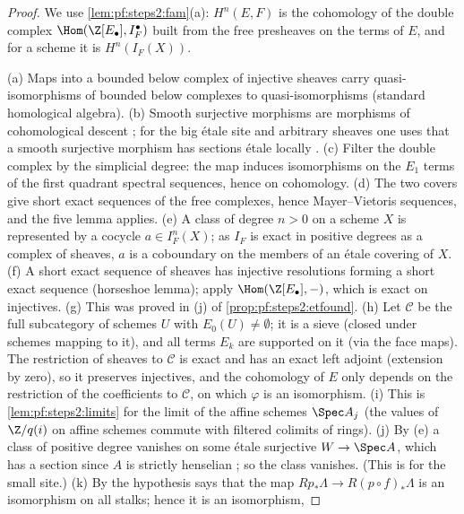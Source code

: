 \begin{proof}
We use \cref{lem:pf:steps2:fam}(a): $H^n(E,F)$ is the cohomology of the double complex
$\Hom(\Z[E_\bullet],I_F^\bullet)$ built from the free presheaves on the terms of $E$, and for a scheme it
is $H^n(I_F(X))$.

(a) Maps into a bounded below complex of injective sheaves carry quasi-isomorphisms of bounded below
complexes to quasi-isomorphisms (standard homological algebra).
(b) Smooth surjective morphisms are morphisms of cohomological descent
\cite[Exp.~V\textsuperscript{bis}, 4.3.3(c)]{ArtinGrothendieckVerdier1972}; for the big \'etale site and
arbitrary sheaves one uses that a smooth surjective morphism has sections \'etale locally
\cite[17.16.3]{Grothendieck1967}.
(c) Filter the double complex by the simplicial degree: the map induces isomorphisms on the $E_1$ terms
of the first quadrant spectral sequences, hence on cohomology.
(d) The two covers give short exact sequences of the free complexes, hence Mayer--Vietoris sequences,
and the five lemma applies.
(e) A class of degree $n>0$ on a scheme $X$ is represented by a cocycle $a\in I_F^n(X)$; as $I_F$ is
exact in positive degrees as a complex of sheaves, $a$ is a coboundary on the members of an \'etale
covering of $X$.
(f) A short exact sequence of sheaves has injective resolutions forming a short exact sequence
(horseshoe lemma); apply $\Hom(\Z[E_\bullet],-)$, which is exact on injectives.
(g) This was proved in (j) of \cref{prop:pf:steps2:etfound}.
(h) Let $\mathcal C$ be the full subcategory of schemes $U$ with $E_0(U)\ne\emptyset$; it is a sieve
(closed under schemes mapping to it), and all terms $E_k$ are supported on it (via the face maps). The
restriction of sheaves to $\mathcal C$ is exact and has an exact left adjoint (extension by zero), so it preserves injectives, and the cohomology of $E$ only depends on the restriction of the
coefficients to $\mathcal C$, on which $\varphi$ is an isomorphism.
(i) This is \cref{lem:pf:steps2:limits} for the limit of the affine schemes $\Spec A_j$ (the values of
$\Z/q(i)$ on affine schemes commute with filtered colimits of rings).
(j) By (e) a class of positive degree vanishes on some \'etale surjective $W\to\Spec A$, which has a
section since $A$ is strictly henselian \cite[Ch.~I, \S4]{Milne1980}; so the class vanishes. (This
is \cite[Exp.~VIII, 4.7]{ArtinGrothendieckVerdier1972} for the small site.)
(k) By \cite[Exp.~VIII, 5.2]{ArtinGrothendieckVerdier1972} the hypothesis says that the map
$Rp_\ast\Lambda\to R(p\circ f)_\ast\Lambda$ is an isomorphism on all stalks; hence it is an isomorphism,

\end{proof}
